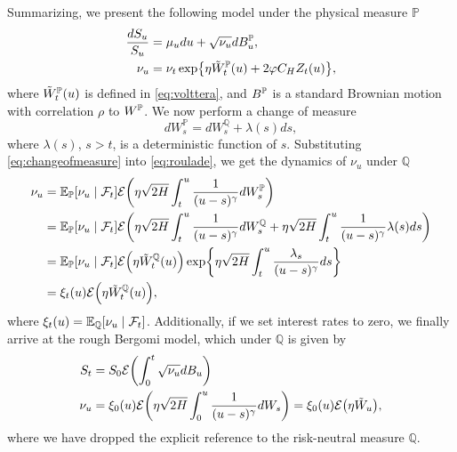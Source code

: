 Summarizing, we present the following model under the physical measure $\mathbb{P}$
\begin{align}
    \frac{dS_{u}}{S_{u}}&= \mu_{u}du + \sqrt{\nu_{u}}dB_{u}^{\p},\\
    \nu_{u}&= \nu_{t}\exp\left\{ \eta \Tilde{W}^{\p}_{t}(u) + 2\varphi C_{H}Z_{t}(u)\right\},
\end{align}
where $\Tilde{W}^{\mathbb{P}}_{t}(u)$ is defined in \eqref{eq:volttera}, and $B^{\mathbb{P}}$ is a standard Brownian motion with correlation $\rho$ to $W^{\mathbb{P}}$. We now perform a change of measure 
\begin{equation}\label{eq:changeofmeasure}
    dW_{s}^{\mathbb{P}}=dW_{s}^{\mathbb{Q}} + \lambda(s)ds,
\end{equation}
where $\lambda(s)$, $s>t$, is a deterministic function of $s$. Substituting \eqref{eq:changeofmeasure} into \eqref{eq:roulade}, we get the dynamics of $\nu_{u}$ under $\mathbb{Q}$
\begin{align}
    \nu_{u}&=\E_{\p}[\nu_{u}\mid \mathcal{F}_{t}]\mathcal{E}\left(\eta\sqrt{2H}\int_{t}^{u}\frac{1}{(u-s)^{\gamma}}dW_{s}^{\p}\right)\\
    &= \E_{\p}[\nu_{u}\mid \mathcal{F}_{t}]\mathcal{E}\left(\eta\sqrt{2H}\int_{t}^{u}\frac{1}{(u-s)^{\gamma}}dW_{s}^{\mathbb{Q}} + \eta\sqrt{2H}\int_{t}^{u}\frac{1}{(u-s)^{\gamma}}\lambda(s)ds\right)\\
    &= \E_{\p}[\nu_{u}\mid \mathcal{F}_{t}]\mathcal{E}\left(\eta\Tilde{W}_{t}^{\mathbb{Q}}(u)\right)\exp\left\{\eta\sqrt{2H}\int_{t}^{u}\frac{\lambda_{s}}{(u-s)^{\gamma}}ds \right\}\\
    &= \xi_{t}(u)\mathcal{E}\left(\eta\Tilde{W}_{t}^{\mathbb{Q}}(u)\right),
\end{align}
where $\xi_{t}(u)=\mathbb{E}_{\mathbb{Q}}[\nu_{u}\mid \mathcal{F}_{t}]$. Additionally, if we set interest rates to zero, we finally arrive at the rough Bergomi model, which under $\mathbb{Q}$ is given by
\begin{align}
S_{t}&= S_{0}\mathcal{E}{\left(\int_{0}^{t}\sqrt{\nu_{u}}dB_{u}\right)}\\
\nu_{u}&= \xi_{0}(u)\mathcal{E}\left(\eta\sqrt{2H}\int_{0}^{u}\frac{1}{(u-s)^{\gamma}}dW_{s}\right)= \xi_{0}(u)\mathcal{E}\left(\eta\Tilde{W}_{u}\right),
\end{align}
where we have dropped the explicit reference to the risk-neutral measure $\mathbb{Q}$.
